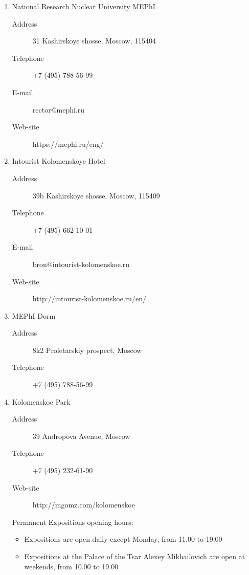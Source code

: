 \documentclass[10pt,fleqn,openany]{book} %
\begin{document}
\begin{enumerate}
	\item National Research Nuclear University MEPhI
		\begin{description}
			\item[Address] 31 Kashirskoye shosse, Moscow, 115404
			\item[Telephone] +7 (495) 788-56-99
	     	\item[E-mail] rector@mephi.ru
	     	\item[Web-site] https://mephi.ru/eng/
		\end{description}

    \item Intourist Kolomenskoye Hotel
    	\begin{description}
    		\item[Address] 39b Kashirskoye shosse, Moscow, 115409
    		\item[Telephone] +7 (495) 662-10-01
    		\item[E-mail] bron@intourist-kolomenskoe.ru
    		\item[Web-site] http://intourist-kolomenskoe.ru/en/
    	\end{description}
	
	\item MEPhI Dorm
	    \begin{description}
	    	\item[Address] 8k2 Proletarskiy prospect, Moscow
	    	\item[Telephone] +7 (495) 788-56-99
	    \end{description}
	
    \item Kolomenskoe Park
        \begin{description}
        	\item[Address] 39 Andropova Avenue, Moscow
        	\item[Telephone] +7 (495) 232-61-90
        	\item[Web-site] http://mgomz.com/kolomenskoe
        \end{description}

	Permanent Expositions opening hours:
		\begin{itemize}
			\item Expositions are open daily except Monday, from 11.00 to 19.00
			\item Expositions at the Palace of the Tsar Alexey Mikhailovich are open at weekends, from 10.00 to 19.00
		\end{itemize}
		

\end{enumerate}
\end{document}
